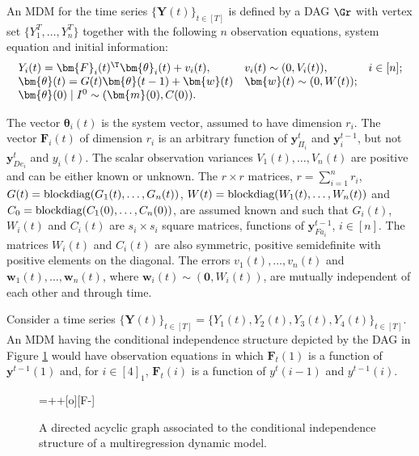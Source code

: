 \begin{definition}
\label{def:MDM}
An \gls{MDM} for the time series $\{\bm{Y}(t)\}_{t\in[T]}$ is defined by a \gls{DAG} $\Gr$ with vertex set $\{Y^T_1,\dots,Y^T_n\}$ together with the following $n$ observation equations, system equation and initial information:
\begin{equation*}
\begin{array}{llc}
Y_i(t)=\bm{F}_i(t)^\T\bm{\theta}_i(t)+v_i(t),&v_i(t)\sim (0,V_i(t)),&i\in[n];\\
\bm{\theta}(t)=G(t)\bm{\theta}(t-1)+\bm{w}(t)&\bm{w}(t)\sim(0,W(t));&\\
\bm{\theta}(0)\;|\; I^0\sim (\bm{m}(0),C(0)).
\end{array}
\end{equation*}

The vector $\bm{\theta}_i(t)$ is the system vector, assumed to have dimension $r_i$.  The vector $\bm{F}_i(t)$ of dimension $r_i$ is an arbitrary function of $\bm{y}^t_{\Pi_i}$ and $\bm{y}^{t-1}_i$, but  not $\bm{y}^t_{De_i}$ and $y_i(t)$.  The scalar observation variances  $V_1(t),\dots, V_n(t)$ are positive and can be either known or unknown. The $r\times r$ matrices, $r=\sum_{i=1}^n r_i$, $G(t)=\textnormal{blockdiag}(G_1(t),\dots,G_n(t))$,  $W(t)=\textnormal{blockdiag}(W_1(t),\dots,W_n(t))$ and   $C_0=\textnormal{blockdiag}(C_1(0),\dots,C_n(0))$, are assumed known   and such that $G_i(t)$, $W_i(t)$ and $C_i(t)$ are $s_i\times s_i$ square matrices, functions of $\bm{y}^{t-1}_{Fa_i}$, $i\in [n]$.  The matrices $W_i(t)$ and $C_i(t)$ are also symmetric, positive semidefinite with     positive elements on the diagonal. The errors $v_1(t),\dots,v_n(t)$ and $\bm{w}_1(t),\dots,\bm{w}_n(t)$, where $\bm{w}_i(t)\sim(\bm{0},W_i(t))$, are mutually independent of each other and through time. 
\end{definition} 

\begin{example}
Consider a time series $\{\bm{Y}(t)\}_{t\in[T]}=\{Y_1(t),Y_2(t),Y_3(t),Y_4(t)\}_{t\in[T]}$. An \gls{MDM} having the conditional independence structure depicted by the \gls{DAG} in Figure \ref{fig:MDM} would have observation equations in which $\bm{F}_t(1)$ is a function of $\bm{y}^{t-1}(1)$ and, for $i\in[4]_1$, $\bm{F}_t(i)$ is a function of $y^{t}(i-1)$ and $y^{t-1}(i)$. 
\end{example}

\begin{figure}
\centerline{
\entrymodifiers={++[o][F-]}
}
\caption{A directed acyclic graph associated to the conditional independence structure of a multiregression dynamic model. \label{fig:MDM}}
\end{figure}

